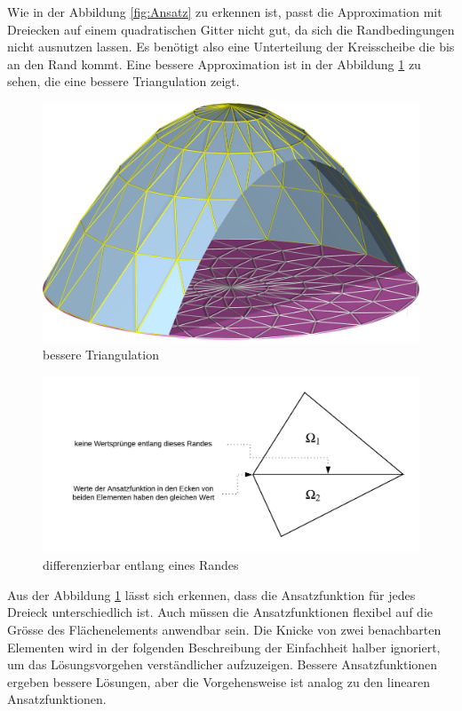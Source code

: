 Wie in der Abbildung \ref{fig:Ansatz} zu erkennen ist, passt die Approximation mit Dreiecken auf einem quadratischen Gitter nicht gut, da sich die Randbedingungen nicht ausnutzen lassen. Es benötigt also eine Unterteilung der Kreisscheibe die bis an den Rand kommt. Eine bessere Approximation ist in der Abbildung \ref{fig:besser Approx} zu sehen, die eine bessere Triangulation zeigt.
\begin{figure}[h!]
	\centering
	\includegraphics[scale=0.8]{papers/fem/Images/polar.jpg}
	\caption{bessere Triangulation}
	\label{fig:besser Approx}
\end{figure}
\begin{figure}[h]
	\centering
	\includegraphics[scale=0.8]{papers/fem/Images/Rand.jpeg}
	\caption{differenzierbar entlang eines Randes}
	\label{fig:Randbedingung}
\end{figure}
Aus der Abbildung \ref{fig:besser Approx} lässt sich erkennen, dass die Ansatzfunktion für jedes Dreieck unterschiedlich ist. Auch müssen die Ansatzfunktionen flexibel auf die Grösse des Flächenelements anwendbar sein. Die Knicke von zwei benachbarten Elementen wird in der folgenden Beschreibung der Einfachheit halber ignoriert, um das Lösungsvorgehen verständlicher aufzuzeigen. Bessere Ansatzfunktionen ergeben bessere Lösungen, aber die Vorgehensweise ist analog zu den linearen Ansatzfunktionen.
